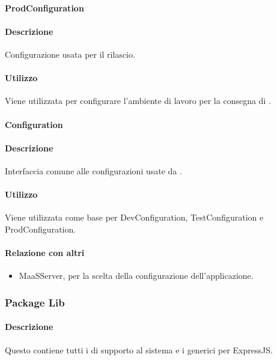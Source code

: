\paragraph{ProdConfiguration}
\paragraph*{Descrizione}
Configurazione usata per il rilascio.

\paragraph*{Utilizzo}
Viene utilizzata per configurare l'ambiente di lavoro per la consegna di .

\paragraph{Configuration}
\paragraph*{Descrizione}
Interfaccia comune alle configurazioni usate da .

\paragraph*{Utilizzo}
Viene utilizzata come base per DevConfiguration, TestConfiguration e ProdConfiguration.

\paragraph*{Relazione con altri }
\begin{itemize}
\item MaaSServer, per la scelta della configurazione dell'applicazione.
\end{itemize}

\subsubsection{Package Lib}
\paragraph*{Descrizione}
Questo  contiene tutti i  di supporto al sistema e i  generici per ExpressJS.

